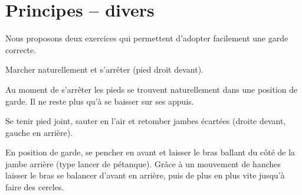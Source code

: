 \chapter{Principes -- divers}


Nous proposons deux exercices qui permettent d'adopter facilement une garde correcte.


\begin{exercice}


Marcher naturellement et s'arrêter (pied droit devant).

Au moment de s'arrêter les pieds se trouvent naturellement dans une position de garde.
Il ne reste plus qu'à se baisser sur ses appuis.

\end{exercice}


\begin{exercice}

Se tenir pied joint, sauter en l'air et retomber jambes écartées (droite devant, gauche en arrière).

\end{exercice}


\begin{exercice}
En position de garde, se pencher en avant et laisser le bras ballant du côté de la jambe arrière (type lancer de pétanque).
Grâce à un mouvement de hanches laisser le bras se balancer d'avant en arrière, puis de plus en plus vite jusqu'à faire des cercles.

\end{exercice}
